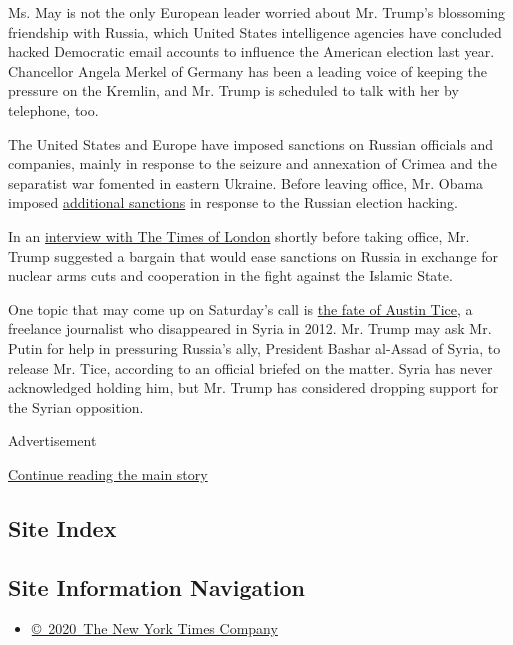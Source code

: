 Ms. May is not the only European leader worried about Mr. Trump's
blossoming friendship with Russia, which United States intelligence
agencies have concluded hacked Democratic email accounts to influence
the American election last year. Chancellor Angela Merkel of Germany has
been a leading voice of keeping the pressure on the Kremlin, and Mr.
Trump is scheduled to talk with her by telephone, too.

The United States and Europe have imposed sanctions on Russian officials
and companies, mainly in response to the seizure and annexation of
Crimea and the separatist war fomented in eastern Ukraine. Before
leaving office, Mr. Obama imposed
\href{https://www.nytimes.com/2016/12/29/us/politics/russia-election-hacking-sanctions.html}{additional
sanctions} in response to the Russian election hacking.

In an
\href{http://www.thetimes.co.uk/article/full-transcript-of-interview-with-donald-trump-5d39sr09d}{interview
with The Times of London} shortly before taking office, Mr. Trump
suggested a bargain that would ease sanctions on Russia in exchange for
nuclear arms cuts and cooperation in the fight against the Islamic
State.

One topic that may come up on Saturday's call is
\href{https://www.nytimes.com/2015/03/27/world/middleeast/us-and-syria-discuss-missing-journalist.html}{the
fate of Austin Tice}, a freelance journalist who disappeared in Syria in
2012. Mr. Trump may ask Mr. Putin for help in pressuring Russia's ally,
President Bashar al-Assad of Syria, to release Mr. Tice, according to an
official briefed on the matter. Syria has never acknowledged holding
him, but Mr. Trump has considered dropping support for the Syrian
opposition.

Advertisement

\protect\hyperlink{after-bottom}{Continue reading the main story}

\hypertarget{site-index}{%
\subsection{Site Index}\label{site-index}}

\hypertarget{site-information-navigation}{%
\subsection{Site Information
Navigation}\label{site-information-navigation}}

\begin{itemize}
\tightlist
\item
  \href{https://help.nytimes.com/hc/en-us/articles/115014792127-Copyright-notice}{©~2020~The
  New York Times Company}
\end{itemize}

